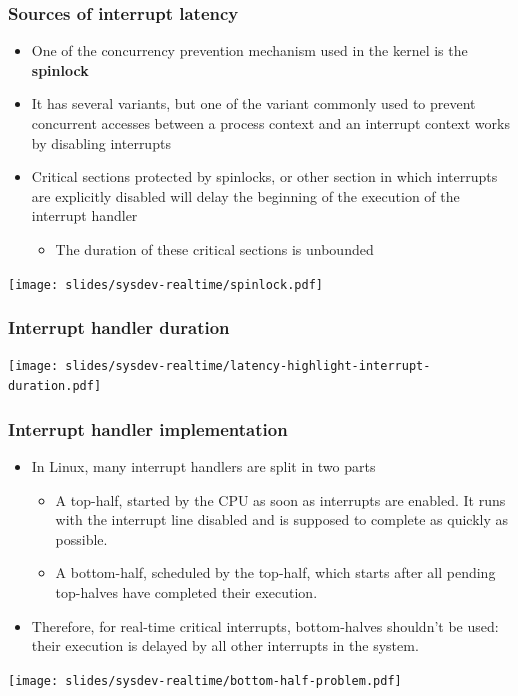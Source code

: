 \begin{frame}
  \frametitle{Sources of interrupt latency}
  \begin{itemize}
  \item One of the concurrency prevention mechanism used in the kernel
    is the {\bf spinlock}
  \item It has several variants, but one of the variant commonly used
    to prevent concurrent accesses between a process context and an
    interrupt context works by disabling interrupts
  \item Critical sections protected by spinlocks, or other section in
    which interrupts are explicitly disabled will delay the beginning
    of the execution of the interrupt handler
    \begin{itemize}
    \item The duration of these critical sections is unbounded
    \end{itemize}
  \end{itemize}
  \begin{center}
    \texttt{[image: slides/sysdev-realtime/spinlock.pdf]}
  \end{center}
\end{frame}

\begin{frame}
\frametitle{Interrupt handler duration}
  \begin{center}
    \texttt{[image: slides/sysdev-realtime/latency-highlight-interrupt-duration.pdf]}
  \end{center}
\end{frame}

\begin{frame}
  \frametitle{Interrupt handler implementation}
  \begin{itemize}
  \item In Linux, many interrupt handlers are split in two parts
    \begin{itemize}
    \item A top-half, started by the CPU as soon as interrupts are
      enabled. It runs with the interrupt line disabled and is
      supposed to complete as quickly as possible.
    \item A bottom-half, scheduled by the top-half, which starts after
      all pending top-halves have completed their execution.
    \end{itemize}
  \item Therefore, for real-time critical interrupts, bottom-halves
    shouldn't be used: their execution is delayed by all other
    interrupts in the system.
  \end{itemize}
  \begin{center}
    \texttt{[image: slides/sysdev-realtime/bottom-half-problem.pdf]}
  \end{center}
\end{frame}

